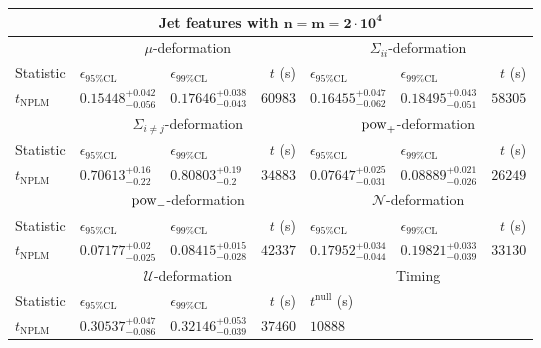 \begin{tabular}{l|llr|llr}
	\toprule
	\multicolumn{7}{c}{{\bf Jet features with $\mathbf{n=m=2\cdot 10^{4}}$}} \\
	\toprule
	\multicolumn{1}{c}{} & \multicolumn{3}{c}{$\mu$-deformation} & \multicolumn{3}{c}{$\Sigma_{ii}$-deformation} \\
	Statistic & $\epsilon_{95\%\mathrm{CL}}$ & $\epsilon_{99\%\mathrm{CL}}$ & $t$ (s) & $\epsilon_{95\%\mathrm{CL}}$ & $\epsilon_{99\%\mathrm{CL}}$ & $t$ (s) \\
	\midrule
	$t_{\mathrm{NPLM}}$ & $0.15448_{-0.056}^{+0.042}$ & $0.17646_{-0.043}^{+0.038}$ & $60983$ & $0.16455_{-0.062}^{+0.047}$ & $0.18495_{-0.051}^{+0.043}$ & $58305$ \\
	\toprule
	\multicolumn{1}{c}{} & \multicolumn{3}{c}{$\Sigma_{i\neq j}$-deformation} & \multicolumn{3}{c}{$\rm{pow}_{+}$-deformation} \\
	Statistic & $\epsilon_{95\%\mathrm{CL}}$ & $\epsilon_{99\%\mathrm{CL}}$ & $t$ (s) & $\epsilon_{95\%\mathrm{CL}}$ & $\epsilon_{99\%\mathrm{CL}}$ & $t$ (s) \\
	\midrule
	$t_{\mathrm{NPLM}}$ & $0.70613_{-0.22}^{+0.16}$ & $0.80803_{-0.2}^{+0.19}$ & $34883$ & $0.07647_{-0.031}^{+0.025}$ & $0.08889_{-0.026}^{+0.021}$ & $26249$ \\
	\toprule
	\multicolumn{1}{c}{} & \multicolumn{3}{c}{$\rm{pow}_{-}$-deformation} & \multicolumn{3}{c}{$\mathcal{N}$-deformation} \\
	Statistic & $\epsilon_{95\%\mathrm{CL}}$ & $\epsilon_{99\%\mathrm{CL}}$ & $t$ (s) & $\epsilon_{95\%\mathrm{CL}}$ & $\epsilon_{99\%\mathrm{CL}}$ & $t$ (s) \\
	\midrule
	$t_{\mathrm{NPLM}}$ & $0.07177_{-0.025}^{+0.02}$ & $0.08415_{-0.028}^{+0.015}$ & $42337$ & $0.17952_{-0.044}^{+0.034}$ & $0.19821_{-0.039}^{+0.033}$ & $33130$ \\
	\toprule
	\multicolumn{1}{c}{} & \multicolumn{3}{c}{$\mathcal{U}$-deformation} & \multicolumn{3}{c}{Timing} \\
	Statistic & $\epsilon_{95\%\mathrm{CL}}$ & $\epsilon_{99\%\mathrm{CL}}$ & $t$ (s) & $t^{\mathrm{null}}$ (s) \\
	\midrule
	$t_{\mathrm{NPLM}}$ & $0.30537_{-0.086}^{+0.047}$ & $0.32146_{-0.039}^{+0.053}$ & $37460$ & $10888$ \\
	\bottomrule
\end{tabular}